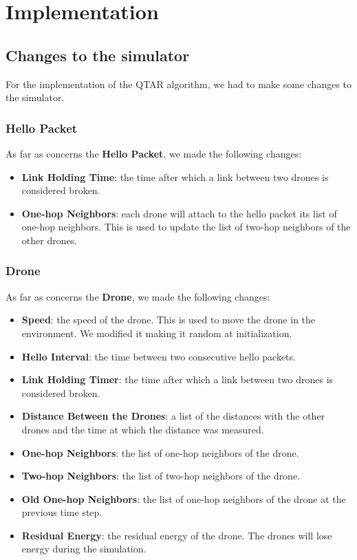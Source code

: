 \section{Implementation}

\subsection{Changes to the simulator}
For the implementation of the QTAR algorithm, we had to make some changes to the simulator.

\subsubsection{Hello Packet}
As far as concerns the \textbf{Hello Packet}, we made the following changes:
\begin{itemize}
    \item \textbf{Link Holding Time}: the time after which a link between two drones is considered broken.
    \item \textbf{One-hop Neighbors}: each drone will attach to the hello packet its list of one-hop neighbors. This is used to update the list of two-hop neighbors of the other drones.
\end{itemize}


\subsubsection{Drone}
As far as concerns the \textbf{Drone}, we made the following changes:
\begin{itemize}
    \item \textbf{Speed}: the speed of the drone. This is used to move the drone in the environment. We modified it making it random at initialization.
    \item \textbf{Hello Interval}: the time between two consecutive hello packets.
    \item \textbf{Link Holding Timer}: the time after which a link between two drones is considered broken.
    \item \textbf{Distance Between the Drones}: a list of the distances with the other drones and the time at which the distance was measured.
    \item \textbf{One-hop Neighbors}: the list of one-hop neighbors of the drone.
    \item \textbf{Two-hop Neighbors}: the list of two-hop neighbors of the drone.
    \item \textbf{Old One-hop Neighbors}: the list of one-hop neighbors of the drone at the previous time step.
    \item \textbf{Residual Energy}: the residual energy of the drone. The drones will lose energy during the simulation.
\end{itemize}


